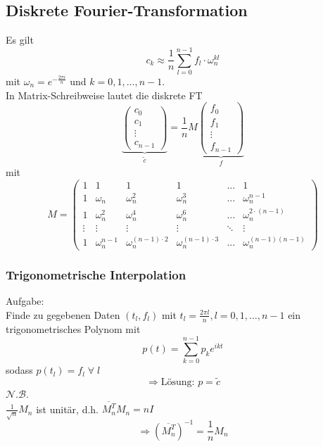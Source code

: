 \documentclass[a4paper,twocolumn,10pt]{article}
\begin{document}
\subsection{Diskrete Fourier-Transformation}
Es gilt
\begin{equation*}
c_k\approx\frac{1}{n}\sum\limits_{l=0}^{n-1}f_l\cdot \omega_n^{kl}
\end{equation*}
mit $\omega_n=e^{-\frac{2\pi i}{n}}$ und $k=0,1,...,n-1$.\\
In Matrix-Schreibweise lautet die diskrete FT
\begin{equation*}
\underbrace{\begin{pmatrix}c_0 \\ c_1 \\ \vdots \\ c_{n-1}\end{pmatrix}}_{\tilde{c}}=\frac{1}{n}M\underbrace{\begin{pmatrix}f_0 \\ f_1 \\ \vdots \\ f_{n-1}\end{pmatrix}}_{f}
\end{equation*}
mit
\begin{equation*}
M=\begin{pmatrix}1 & 1 & 1 & 1 & ... & 1 \\ 1 & \omega_n & \omega_n^2 & \omega_n^3 & ... & \omega_n^{n-1} \\ 1 & \omega_n^2 & \omega_n^4 & \omega_n^6 & ... & \omega_n^{2\cdot(n-1)} \\ \vdots & \vdots & \vdots & \vdots & \ddots & \vdots \\ 1 & \omega_n^{n-1} & \omega_n^{(n-1)\cdot 2} & \omega_n^{(n-1)\cdot 3} & ... & \omega_n^{(n-1)(n-1)}\end{pmatrix}
\end{equation*}

\subsubsection{Trigonometrische Interpolation}
Aufgabe:\\
Finde zu gegebenen Daten $(t_l,f_l)$ mit $t_l=\frac{2\pi l}{n}, l=0,1,...,n-1$ ein trigonometrisches Polynom mit
\begin{equation*}
p(t)=\sum\limits_{k=0}^{n-1}p_ke^{ikt}
\end{equation*}
sodass $p(t_l)=f_l\;\forall\;l$
\begin{equation*}
\Rightarrow \text{Lösung: }p=\tilde{c}
\end{equation*}
\underline{$\mathcal{N.B.}$}\\
$\frac{1}{\sqrt{n}}M_n$ ist unitär, d.h. $\overline{M_n^T}M_n=nI$
\begin{equation*}
\Rightarrow \left(\overline{M_n^T}\right)^{-1}=\frac{1}{n}M_n
\end{equation*}
\end{document}
